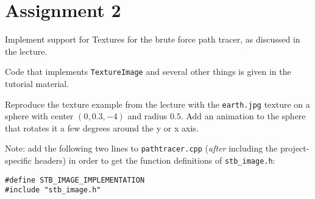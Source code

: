 \documentclass[a4paper,11pt]{article}
\newcommand{\code}[1]{\texttt{#1}}
\begin{document}
\section*{Assignment 2}

Implement support for Textures for the brute force path tracer, as discussed in
the lecture.

Code that implements \code{TextureImage} and several other things is given in the
tutorial material.

Reproduce the texture example from the lecture with the \code{earth.jpg} texture
on a sphere with center $(0, 0.3, -4)$ and radius $0.5$. Add an animation to the
sphere that rotates it a few degrees around the y or x axis.

Note: add the following two lines to \code{pathtracer.cpp} (\emph{after}
including the project-specific headers) in order to get the
function definitions of \code{stb\_image.h}:
\begin{lstlisting}
#define STB_IMAGE_IMPLEMENTATION
#include "stb_image.h"
\end{lstlisting}
\end{document}
